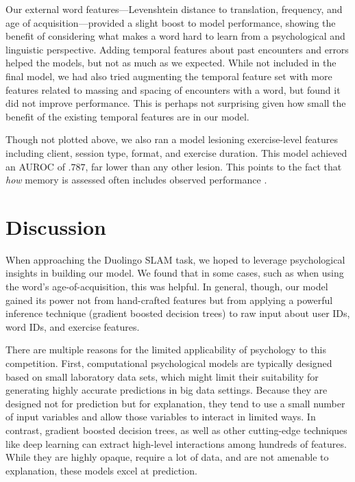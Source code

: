 \documentclass[11pt,a4paper]{article}
\begin{document}
Our external word features---Levenshtein distance to translation, frequency, and
age of acquisition---provided a slight boost to model performance, showing the
benefit of considering what makes a word hard to learn from a psychological and
linguistic perspective. Adding temporal features about past encounters and
errors helped the models, but not as much as we expected. While not included in
the final model, we had also tried augmenting the temporal feature set with more
features related to massing and spacing of encounters with a word, but found it
did not improve performance. This is perhaps not surprising given how small the
benefit of the existing temporal features are in our model.

Though not plotted above, we also ran a model lesioning exercise-level features
including client, session type, format, and exercise duration. This model
achieved an AUROC of $.787$, far lower than any other lesion. This points to the
fact that \emph{how} memory is assessed often includes observed performance 
\cite[e.g., the large literature in psychology on the difference between recall and recognition memory,][]{yonelinas2002nature}. 

\section{Discussion}

When approaching the Duolingo SLAM task, we hoped to leverage psychological
insights in building our model. We found that in some cases, such as when using the
word's age-of-acquisition, this was helpful. In general, though, our model gained its
power not from hand-crafted features but from applying a powerful inference
technique (gradient boosted decision trees) to raw input about user IDs, word IDs, and
exercise features.

There are multiple reasons for the limited applicability of psychology to this
competition. First, computational psychological models are typically designed based 
on small laboratory data sets, which might limit their suitability for generating highly
accurate predictions in big data settings.
Because they are designed not for prediction but for explanation, they tend to
use a small number of input variables and allow those variables to interact
in limited ways. In contrast, gradient boosted decision trees, as well as other
cutting-edge techniques like deep learning can extract high-level
interactions among hundreds of features. While they are highly opaque, require
a lot of data, and are not amenable to explanation, these models excel at prediction.
\end{document}
